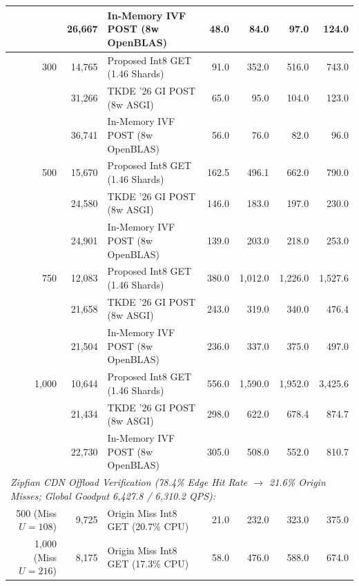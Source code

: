 \documentclass[11pt,journal,compsoc,onecolumn]{IEEEtran}
\begin{document}
\begin{table}[H]
{\begin{tabular}{rrlrrrr}
    & 26,667 & In-Memory IVF POST (8w OpenBLAS) & 48.0 & 84.0 & 97.0 & 124.0 \\
\midrule
300 & 14,765 & Proposed Int8 GET (1.46 Shards) & 91.0 & 352.0 & 516.0 & 743.0 \\
    & 31,266 & TKDE '26 GI POST (8w ASGI)     & 65.0 & 95.0 & 104.0 & 123.0 \\
    & 36,741 & In-Memory IVF POST (8w OpenBLAS) & 56.0 & 76.0 & 82.0 & 96.0 \\
\midrule
500 & 15,670 & Proposed Int8 GET (1.46 Shards) & 162.5 & 496.1 & 662.0 & 790.0 \\
    & 24,580 & TKDE '26 GI POST (8w ASGI)     & 146.0 & 183.0 & 197.0 & 230.0 \\
    & 24,901 & In-Memory IVF POST (8w OpenBLAS) & 139.0 & 203.0 & 218.0 & 253.0 \\
\midrule
750 & 12,083 & Proposed Int8 GET (1.46 Shards) & 380.0 & 1,012.0 & 1,226.0 & 1,527.6 \\
    & 21,658 & TKDE '26 GI POST (8w ASGI)     & 243.0 & 319.0 & 340.0 & 476.4 \\
    & 21,504 & In-Memory IVF POST (8w OpenBLAS) & 236.0 & 337.0 & 375.0 & 497.0 \\
\midrule
1,000 & 10,644 & Proposed Int8 GET (1.46 Shards) & 556.0 & 1,590.0 & 1,952.0 & 3,425.6 \\
      & 21,434 & TKDE '26 GI POST (8w ASGI)     & 298.0 & 622.0 & 678.4 & 874.7 \\
      & 22,730 & In-Memory IVF POST (8w OpenBLAS) & 305.0 & 508.0 & 552.0 & 810.7 \\
\midrule
\multicolumn{7}{l}{\textit{Zipfian CDN Offload Verification (78.4\% Edge Hit Rate $\to$ 21.6\% Origin Misses; Global Goodput 6,427.8 / 6,310.2 QPS):}} \\
500 (Miss $U{=}108$) & 9,725 & Origin Miss Int8 GET (20.7\% CPU) & 21.0 & 232.0 & 323.0 & 375.0 \\
1,000 (Miss $U{=}216$) & 8,175 & Origin Miss Int8 GET (17.3\% CPU) & 58.0 & 476.0 & 588.0 & 674.0 \\
\bottomrule
\end{tabular}%
}
\end{table}
\end{document}
